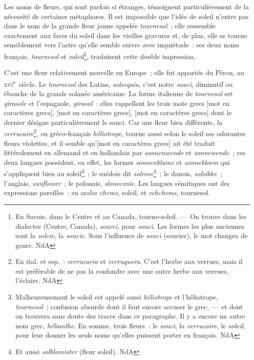 \documentclass[french,twoside]{book} %
\def\mednobreak{\ifdim\lastskip<\medskipamount
  \removelastskip\nopagebreak\medskip\fi}
\newcommand{\labelblock}[1]{\medbreak{\noindent\color{rubric}\bfseries #1}\par\mednobreak}
\begin{document}
\labelblock{{\itshape Tournesol.}}

\noindent Les noms de fleurs, qui sont parfois si étranges, témoignent particulièrement de la nécessité de certaines métaphores. Il est impossible que l’idée de soleil n’entre pas dans le nom de la grande fleur jaune appelée {\itshape tournesol} ; elle ressemble exactement aux faces du soleil dans les vieilles gravures et, de plus, elle se tourne sensiblement vers l’astre qu’elle semble suivre avec inquiétude : ses deux noms français, {\itshape tournesol} et {\itshape soleil}\footnote{ En Savoie, dans le Centre et au Canada, tourne-soleil. — On trouve dans les dialectes (Centre, Canada), {\itshape sourci}, pour {\itshape souci}. Les formes les plus anciennes sont la {\itshape solcie}, la {\itshape soucie}. Sous l’influence de {\itshape souci} (soucier), le mot changea de genre. NdA}, traduisent cette double impression.\par
C’est une fleur relativement nouvelle en Europe ; elle fut apportée du Pérou, au \textsc{xvi}\textsuperscript{e} siècle. Le {\itshape tournesol} des Latins, {\itshape solsequia}, c’est notre {\itshape souci}, diminutif ou ébauche de la grande solanée américaine. La forme italienne de {\itshape tournesol} est {\itshape girasole} et l’espagnole, {\itshape girasol} : elles rappellent les trois mots grecs [mot en caractères grecs], [mot en caractères grecs], [mot en caractères grecs] dont le dernier désigne particulièrement le souci. Car une fleur bien différente, la {\itshape verrucaire}\footnote{ En ital. et esp. : {\itshape verrucaria} et {\itshape verruguera}. C’est l’herbe aux verrues, mais il est préférable de ne pas la confondre avec une autre herbe aux verrues, l’éclaire. NdA}, en gréco-français {\itshape héliotrope}, tourne aussi selon le soleil ses odorantes fleurs violettes, et il semble qu’[mot en caractères grecs] ait été traduit littéralement en allemand et en hollandais par {\itshape sonnenwende} et {\itshape zonnewende} ; ces deux langues possèdent, en effet, les formes {\itshape sonnenblume} et {\itshape zonnebloem} qui s’appliquent bien au soleil\footnote{ Malheureusement le soleil est appelé aussi {\itshape héliotrope} et l’héliotrope, {\itshape tournesol} ; confusion absurde dont il faut encore accuser le grec, — et dont on trouvera sans doute des traces dans ce paragraphe. Il y a encore un autre nom grec, {\itshape hélianthe}. En somme, trois fleurs : le {\itshape souci}, la {\itshape verrucaire}, le {\itshape soleil}, pour leur donner les seuls noms qu’elles puissent porter en français. NdA} ; le suédois dit {\itshape solrose}\footnote{ Et aussi {\itshape solblomister} (fleur soleil). NdA} ; le danois, {\itshape solsikke} ; l’anglais, {\itshape sunflower} ; le polonais, {\itshape slonecznie}. Les langues sémitiques ont des expressions pareilles : en arabe {\itshape chems}, soleil, et {\itshape echchems}, tournesol.\par
\end{document}
